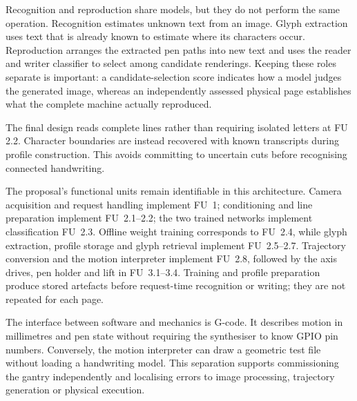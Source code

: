 Recognition and reproduction share models, but they do not perform the same operation. Recognition estimates unknown text from an image. Glyph extraction uses text that is already known to estimate where its characters occur. Reproduction arranges the extracted pen paths into new text and uses the reader and writer classifier to select among candidate renderings. Keeping these roles separate is important: a candidate-selection score indicates how a model judges the generated image, whereas an independently assessed physical page establishes what the complete machine actually reproduced.

The final design reads complete lines rather than requiring isolated letters at FU 2.2. Character boundaries are instead recovered with known transcripts during profile construction. This avoids committing to uncertain cuts before recognising connected handwriting.

The proposal's functional units remain identifiable in this architecture. Camera acquisition and request handling implement FU~1; conditioning and line preparation implement FU~2.1--2.2; the two trained networks implement classification FU~2.3. Offline weight training corresponds to FU~2.4, while glyph extraction, profile storage and glyph retrieval implement FU~2.5--2.7. Trajectory conversion and the motion interpreter implement FU~2.8, followed by the axis drives, pen holder and lift in FU~3.1--3.4. Training and profile preparation produce stored artefacts before request-time recognition or writing; they are not repeated for each page.

The interface between software and mechanics is G-code. It describes motion in millimetres and pen state without requiring the synthesiser to know GPIO pin numbers. Conversely, the motion interpreter can draw a geometric test file without loading a handwriting model. This separation supports commissioning the gantry independently and localising errors to image processing, trajectory generation or physical execution.
\FloatBarrier
